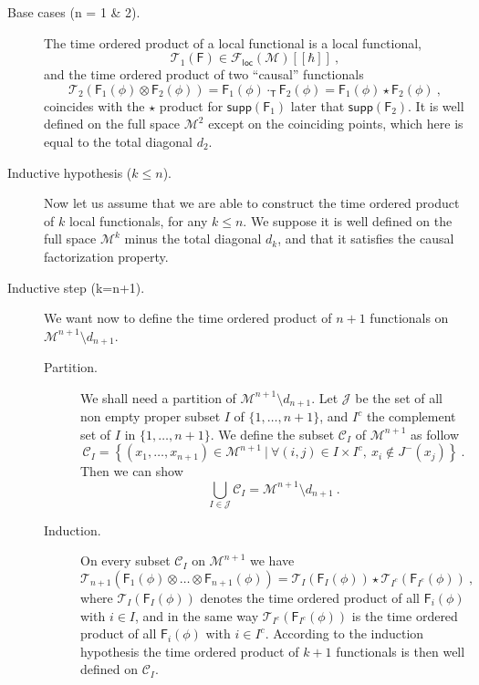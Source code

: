 \documentclass[11pt]{book}
\newcommand{\supp}{\mathsf{supp}}
\newcommand{\loc}{\mathsf{loc}}
\newcommand{\Ccal}{\mathcal{C}}
\newcommand{\Fcal}{\mathcal{F}}
\newcommand{\Jcal}{\mathcal{J}}
\newcommand{\Mcal}{\mathcal{M}}
\newcommand{\Tcal}{\mathcal{T}}
\newcommand{\Fsf}{\mathsf{F}}
\newcommand{\Tsf}{\mathsf{T}}
\theoremstyle{break}
\begin{document}
\begin{description}


\item[Base cases (n = 1 \& 2).] The time ordered product of a local functional is a local functional,
\begin{equation*}
\Tcal_1(\Fsf) \in \Fcal_\loc(\Mcal)[[\hbar]] \ , 
\end{equation*}
%
and the time ordered product of two ``causal'' functionals 
%
\begin{equation*}
\Tcal_2\left(\Fsf_1(\phi)\otimes\Fsf_2(\phi)\right) = \Fsf_1(\phi) \cdot_\Tsf \Fsf_2(\phi) = \Fsf_1(\phi) \star \Fsf_2(\phi) \ ,
\end{equation*}
%
coincides with the $\star$ product for $\supp(\Fsf_1)$ later that $\supp(\Fsf_2)$. It is well defined on the full space $\Mcal^2$ except on the coinciding points, which here is equal to the total diagonal $d_2$.


\item[Inductive hypothesis ($k\leq n$).] Now let us assume that we are able to construct the time ordered product of $k$ local functionals, for any $k \leq n$. We suppose it is well defined on the full space $\Mcal^k$ minus the total diagonal $d_k$, and that it satisfies the causal factorization property. 


\item[Inductive step (k=n+1).] We want now to define the time ordered product of $n+1$ functionals on $\Mcal^{n+1}\setminus d_{n+1}$.


\begin{description}


\item[Partition.] We shall need a partition of $\Mcal^{n+1}\setminus d_{n+1}$. Let $\Jcal$ be the set of all non empty proper subset $I$ of $\{1,\dots,n+1\}$, and $I^c$ the complement set of $I$ in $\{1,\dots,n+1\}$. We define the subset $\Ccal_I$ of $\Mcal^{n+1}$ as follow
%
\begin{equation*}
\Ccal_I = \left\{ (x_1,\dots,x_{n+1}) \in \Mcal^{n+1} \ | \ \forall (i,j) \in I \times I^c , \ x_i \notin J^-(x_j) \right\} \ .
\end{equation*}
%
Then we can show \cite[lemma 4.1]{BF_2000}
%
\begin{equation*}
\bigcup_{I \in \Jcal} \Ccal_I = \Mcal^{n+1} \setminus d_{n+1} \ .
\end{equation*}


\item[Induction.] On every subset $\Ccal_I$ on $\Mcal^{n+1}$ we have 
%
\begin{equation*}
\Tcal_{n+1}\left(\Fsf_1(\phi) \otimes \dots \otimes \Fsf_{n+1}(\phi) \right) = \Tcal_{I}\left(\Fsf_I(\phi)\right) \star \Tcal_{I^c}\left(\Fsf_{I^c}(\phi)\right) \ , 
\end{equation*}
%
where $\Tcal_{I}\left(\Fsf_I(\phi)\right)$ denotes the time ordered product of all $\Fsf_i(\phi)$ with $i \in I$, and in the same way $\Tcal_{I^c}\left(\Fsf_{I^c}(\phi)\right)$ is the time ordered product of all $\Fsf_i(\phi)$ with $i \in I^c$. According to the induction hypothesis the time ordered product of $k+1$ functionals is then well defined on $\Ccal_I$. 



\end{description}
\end{description}
\end{document}
